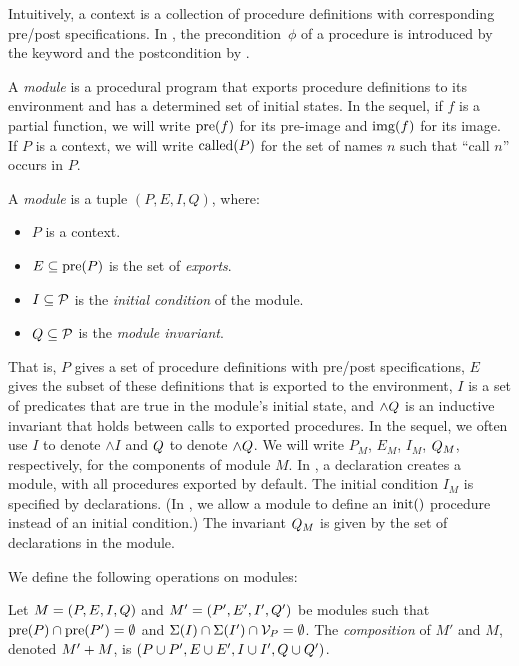 Intuitively, a context is a collection of procedure definitions with
corresponding pre/post specifications. In \Lang, the precondition~$\phi$ of a procedure
is introduced by the  keyword and the postcondition by .


A \emph{module} is a procedural
program that exports procedure definitions to its environment and has
a determined set of initial states.
In the sequel, if $f$ is a partial function, we will write $\mbox{\rm pre}(f)$ for its pre-image and
$\mbox{\rm img}(f)$ for its image. If $P$ is a context, we will write $\mbox{\rm called}(P)$
for the set of names $n$ such that ``call $n$'' occurs in $P$.

\begin{definition}
  \label{def:modulesem}
  A \emph{module} is a tuple $(P,E,I,Q)$, where:
  \begin{itemize}
  \item $P$ is a context.
  \item $E \subseteq \mbox{\rm pre}(P)$ is the set of \emph{exports}.
  \item $I \subseteq \mathcal{P}$ is the \emph{initial condition} of the module.
  \item $Q \subseteq \mathcal{P}$ is the \emph{module invariant}.
  \end{itemize}
\end{definition}

That is, $P$ gives a set of procedure definitions with pre/post
specifications, $E$ gives the subset of these definitions that is
exported to the environment,
$I$ is a set of predicates that are true in the module's initial state,
and $\wedge Q$ is an inductive invariant that holds between calls to exported procedures.
In the sequel, we often use $I$ to denote $\wedge I$ and $Q$ to denote $\wedge Q$.
We will write $P_M$, $E_M$, $I_M$, $Q_M$, respectively, for the components of module $M$.
In \Lang, a  declaration creates a module, with all procedures exported by default.
The initial condition $I_M$ is specified  by  declarations.
(In , we allow a module to define an ${\text{init}}()$ procedure instead of an initial condition.)
The invariant $Q_M$ is given by the set of  declarations in the module.

We define the following operations on modules:
\begin{definition}
  Let $M = (P,E,I,Q)$ and $M' = (P',E',I',Q')$ be modules such that
  $\mbox{\rm pre}(P) \cap \mbox{\rm pre}(P') = \emptyset$ and ${\Sigma}(I) \cap {\ensuremath{\Sigma}}(I') \cap \mathcal{V}_{P} = \emptyset$.
  The \emph{composition} of $M'$ and $M$,
  denoted $M' + M$, is $(P\cup P', E \cup E' , I \cup I',Q\cup Q')$.
\end{definition}

